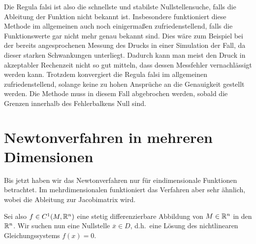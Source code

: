 Die Regula falsi ist also die schnellste und stabilste
Nullstellensuche, falls die Ableitung der Funktion nicht bekannt
ist. Insbesondere funktioniert diese Methode im allgemeinen auch noch
einigermaßen zufriedenstellend, falls die Funktionswerte gar nicht
mehr genau bekannt sind. Dies wäre zum Beispiel bei der bereits
angesprochenen Messung des Drucks in einer Simulation der Fall, da
dieser starken Schwankungen unterliegt. Dadurch kann man meist den
Druck in akzeptabler Rechenzeit nicht so gut mitteln, dass dessen
Messfehler vernachlässigt werden kann.  Trotzdem konvergiert die
Regula falsi im allgemeinen zufriedenstellend, solange keine zu hohen
Ansprüche an die Genauigkeit gestellt werden. Die Methode muss in
diesem Fall abgebrochen werden, sobald die Grenzen innerhalb des
Fehlerbalkens Null sind.

\section{Newtonverfahren in mehreren Dimensionen}

Bis jetzt haben wir das Newtonverfahren nur für eindimensionale
Funktionen betrachtet. Im mehrdimensionalen funktioniert das Verfahren
aber sehr ähnlich, wobei die Ableitung zur Jacobimatrix wird.

Sei also $f\in C^1(M, \mathbb{R}^n)$ eine stetig differenzierbare Abbildung
von $M\in\mathbb{R}^n$ in den $\mathbb{R}^n$. Wir suchen nun eine Nullstelle
$\overline{x}\in D$, d.h.\ eine Lösung des nichtlinearen
Gleichungssystems $f(x) = 0$.

